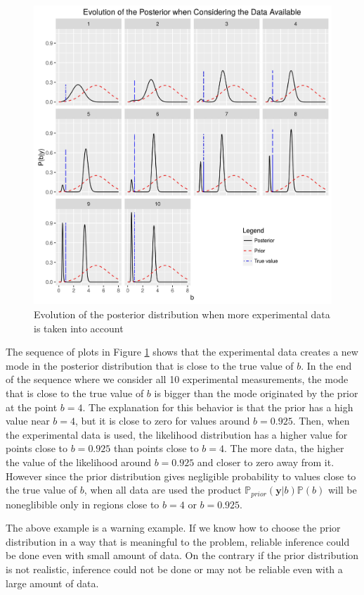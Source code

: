 \documentclass[12pt]{book}
\newcommand{\prior}{\mathbb{P}_{prior}}
\newcommand{\p}{\mathbb{P}}
\newcommand{\y}{\textbf{y}}
\begin{document}
\begin{figure}[H]
\centering
\includegraphics[scale=0.7]{./FigChap3/posterior_evolution}
\caption{Evolution of the posterior distribution when more experimental data is taken into account}
\label{figpostevolution}
\end{figure}

The sequence of plots in Figure \ref{figpostevolution} shows that the experimental data creates a new mode
in the posterior distribution that is close to the true value of $b$. In the end of the sequence where we consider
all 10 experimental measurements, the mode that is close to the true value of $b$ is bigger than the mode originated
by the prior at the point $b=4$. The explanation for this behavior  is that the prior  has a high value near $b=4$, 
but it is close to zero for values around $b=0.925$.
Then, when the experimental data is used, the likelihood distribution has a higher  value for points  close to $b=0.925$
than points close to $b=4$. The more data, the higher the value of the likelihood around $b=0.925$ and closer to zero
away from it. However since
the prior distribution gives negligible probability to values close to the true value of $b$, when all data are used the 
product $\prior(\y|b)\p(b)$ will be noneglibible only in regions close to $b=4$ or $b=0.925$.

The above example is a warning example. If we know how to choose the prior distribution in a way that is meaningful to the
problem, reliable inference could be done even with small amount of data. On the contrary if the prior distribution
is not realistic, inference could not be done or  may not be reliable even with a large amount of data.  
\newpage
\end{document}
